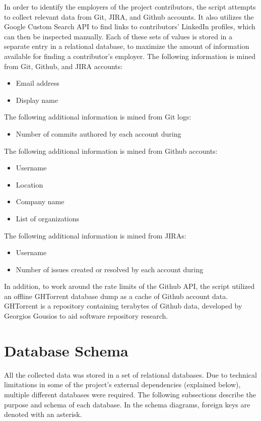 In order to identify the employers of the project contributors, the script attempts to collect relevant data from Git, JIRA, and Github accounts. It also utilizes the Google Custom Search API to find links to contributors' LinkedIn profiles, which can then be inspected manually. Each of these sets of values is stored in a separate entry in a relational database, to maximize the amount of information available for finding a contributor's employer.
The following information is mined from Git, Github, and JIRA accounts:
\begin{itemize}
	\item Email address
	\item Display name
\end{itemize}
The following additional information is mined from Git logs:
\begin{itemize}
	\item Number of commits authored by each account during \timeperiod{}
\end{itemize}
The following additional information is mined from Github accounts:
\begin{itemize}
	\item Username
	\item Location
	\item Company name
	\item List of organizations
\end{itemize}
The following additional information is mined from JIRAs:
\begin{itemize}
	\item Username
	\item Number of issues created or resolved by each account during \timeperiod{}
\end{itemize}
In addition, to work around the rate limits of the Github API, the script utilized an offline GHTorrent database dump as a cache of Github account data. GHTorrent is a repository containing terabytes of Github data, developed by Georgios Gousios to aid software repository research\cite{Gousi13}.

 

\section{Database Schema}
All the collected data was stored in a set of relational databases. Due to technical limitations in some of the project's external dependencies (explained below), multiple different databases were required. The following subsections describe the purpose and schema of each database. In the schema diagrams, foreign keys are denoted with an asterisk.
